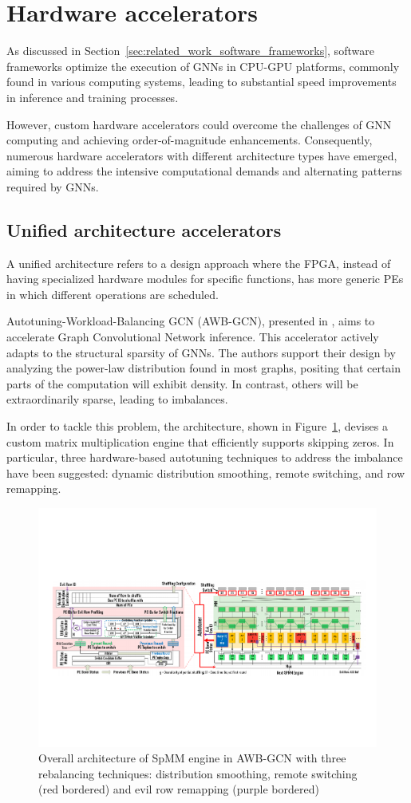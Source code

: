 \section{Hardware accelerators}
\label{sec:hardware_accelerators}%

As discussed in Section~\ref{sec:related_work_software_frameworks}, software frameworks optimize the execution of GNNs in CPU-GPU platforms, commonly found in various computing systems, leading to substantial speed improvements in inference and training processes.

However, custom hardware accelerators could overcome the challenges of GNN computing and achieving order-of-magnitude enhancements.
Consequently, numerous hardware accelerators with different architecture types have emerged, aiming to address the intensive computational demands and alternating patterns required by GNNs.

\subsection{Unified architecture accelerators}\label{subsec:unified-architecture-accelerators}%

A unified architecture refers to a design approach where the FPGA, instead of having specialized hardware modules for specific functions, has more generic PEs in which different operations are scheduled.

Autotuning-Workload-Balancing GCN (AWB-GCN), presented in \cite{DBLP:journals/corr/abs-1908-10834}, aims to accelerate Graph Convolutional Network inference.
This accelerator actively adapts to the structural sparsity of GNNs. The authors support their design by analyzing the power-law distribution found in most graphs, positing that certain parts of the computation will exhibit density. In contrast, others will be extraordinarily sparse, leading to imbalances.

In order to tackle this problem, the architecture, shown in Figure~\ref{fig:awb_gcn_architecture}, devises a custom matrix multiplication engine that efficiently supports skipping zeros.
In particular, three hardware-based autotuning techniques to address the imbalance have been suggested: dynamic distribution smoothing, remote switching, and row remapping.

\begin{figure}[t]
    \centering
    \includegraphics[height=0.28\textwidth]{Images/AWB_GCN_SpMM_architecture}
    \caption[Overall architecture of SpMM engine in AWB-GCN~\cite{DBLP:journals/corr/abs-1908-10834}]{Overall architecture of SpMM engine in AWB-GCN with three rebalancing techniques: distribution smoothing, remote switching (red bordered) and evil row remapping (purple bordered)~\cite{DBLP:journals/corr/abs-1908-10834}}
    \label{fig:awb_gcn_architecture}
\end{figure}

